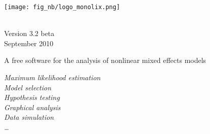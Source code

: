 \documentclass[11pt,a4paper]{report}
\begin{document}
\pagestyle{empty}



\vspace*{-3cm}
\hspace*{-2cm}
\texttt{[image: fig\_nb/logo\_monolix.png]}

\vspace*{2cm}

\begin{center}
{\color[named]{Maroon}
{\Huge \bf \monolix} \\[.5cm]
{\Large Version 3.2 beta} \\[.5cm]
{\sc  September 2010}
\\[1cm]
}

{\color[named]{Brown} { \Large  A free software for the analysis of
        nonlinear mixed effects models}
}

\end{center}
{\color[named]{Orange}
{\Large \sl \hspace*{1cm} Maximum likelihood estimation \\[.2cm]
\hspace*{3cm} Model selection \\[.2cm]
\hspace*{5cm} Hypothesis testing \\[.2cm]
\hspace*{7cm} Graphical analysis \\[.2cm]
\hspace*{9cm} Data simulation \\[.2cm]
\hspace*{12cm} \ldots  } } \vspace*{2.5cm}
\end{document}

